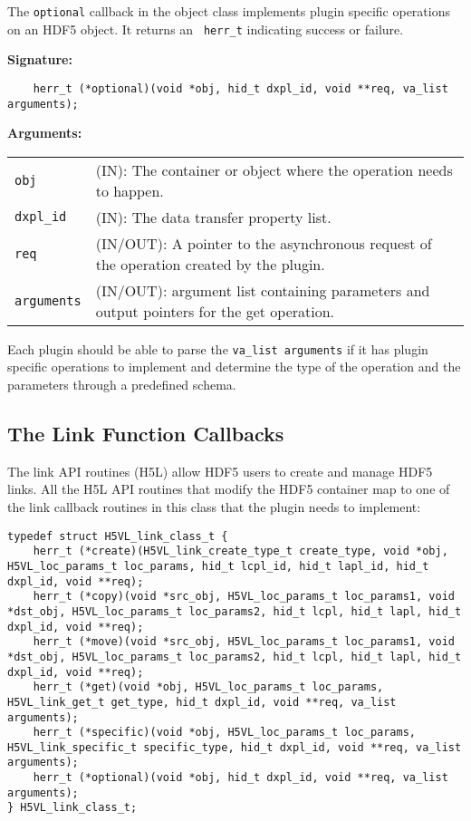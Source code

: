 The {\tt optional} callback in the object class implements plugin specific operations on an HDF5 object. It returns an {\tt
  herr\_t} indicating success or failure. 

\textbf{Signature:}
\begin{lstlisting}
    herr_t (*optional)(void *obj, hid_t dxpl_id, void **req, va_list arguments);
\end{lstlisting}

\textbf{Arguments:}\\
\begin{tabular}{l p{10cm}}
  {\tt obj} & (IN): The container or object where the operation needs to happen.\\
  {\tt dxpl\_id} & (IN): The data transfer property list.\\
  {\tt req} & (IN/OUT): A pointer to the asynchronous request of the operation created by the plugin.\\
  {\tt arguments} & (IN/OUT): argument list containing parameters and output pointers for the get operation. \\
\end{tabular}

Each plugin should be able to parse the {\tt va\_list arguments} if it has plugin specific operations to implement and determine the type of the operation and the parameters through a predefined schema. 

\subsection{The Link Function Callbacks}
The link API routines (H5L) allow HDF5 users to create and manage
HDF5 links. All the H5L API routines that modify the HDF5 container
map to one of the link callback routines in this class that the
plugin needs to implement:

\begin{lstlisting}
typedef struct H5VL_link_class_t {
    herr_t (*create)(H5VL_link_create_type_t create_type, void *obj, H5VL_loc_params_t loc_params, hid_t lcpl_id, hid_t lapl_id, hid_t dxpl_id, void **req);
    herr_t (*copy)(void *src_obj, H5VL_loc_params_t loc_params1, void *dst_obj, H5VL_loc_params_t loc_params2, hid_t lcpl, hid_t lapl, hid_t dxpl_id, void **req);
    herr_t (*move)(void *src_obj, H5VL_loc_params_t loc_params1, void *dst_obj, H5VL_loc_params_t loc_params2, hid_t lcpl, hid_t lapl, hid_t dxpl_id, void **req);
    herr_t (*get)(void *obj, H5VL_loc_params_t loc_params, H5VL_link_get_t get_type, hid_t dxpl_id, void **req, va_list arguments);
    herr_t (*specific)(void *obj, H5VL_loc_params_t loc_params, H5VL_link_specific_t specific_type, hid_t dxpl_id, void **req, va_list arguments);
    herr_t (*optional)(void *obj, hid_t dxpl_id, void **req, va_list arguments);
} H5VL_link_class_t;
\end{lstlisting}


